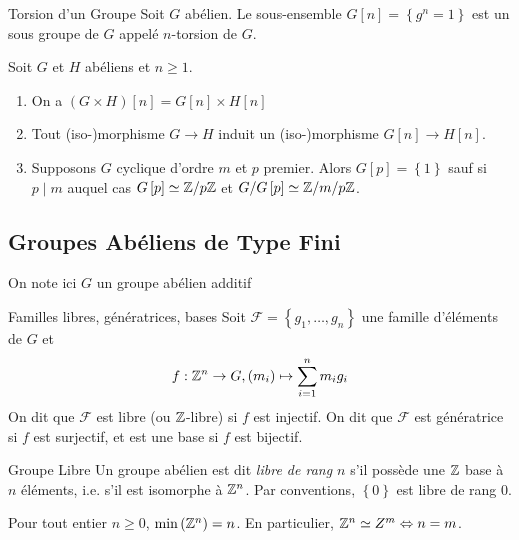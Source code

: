 \documentclass{cours}
\begin{document}
\begin{définition}{Torsion d'un Groupe}{}
    Soit $G$ abélien. Le sous-ensemble $G\left[n\right] = \left\{g^{n} = 1\right\}$ est un sous groupe de $G$ appelé $n$-torsion de $G$.
\end{définition}

\begin{lemma}
    Soit $G$ et $H$ abéliens et $n \geq 1$.
    \begin{enumerate}
        \item On a $\left(G \times H\right)\left[n\right] = G\left[n\right] \times H\left[n\right]$
        \item Tout (iso-)morphisme $G \rightarrow H$ induit un (iso-)morphisme $G\left[n\right] \rightarrow H\left[n\right]$.
        \item Supposons $G$ cyclique d'ordre $m$ et $p$ premier. Alors $G\left[p\right] = \left\{1\right\}$ sauf si $p \mid m$ auquel cas $G\left[p\right] \simeq \mathbb{Z}/p\mathbb{Z}$ et $G/G\left[p\right] \simeq \mathbb{Z}/m/p\mathbb{Z}$.
    \end{enumerate}
\end{lemma}

\subsection{Groupes Abéliens de Type Fini}
On note ici $G$ un groupe abélien additif

\begin{définition}{Familles libres, génératrices, bases}{}
    Soit $\mathcal{F} = \left\{g_{1},\ldots, g_{n}\right\}$ une famille d'éléments de $G$ et
    \[
        f : \mathbb{Z}^{n} \rightarrow G, (m_{i}) \mapsto \sum_{i = 1}^{n}m_{i}g_{i}
    \]
    On dit que $\mathcal{F}$ est libre (ou $\mathbb{Z}$-libre) si $f$ est injectif. On dit que $\mathcal{F}$ est génératrice si $f$ est surjectif, et est une base si $f$ est bijectif.
\end{définition}

\begin{définition}{Groupe Libre}{}
    Un groupe abélien est dit \emph{libre de rang $n$} s'il possède une $\mathbb{Z}$ base à $n$ éléments, i.e. s'il est isomorphe à $\mathbb{Z}^{n}$. Par conventions, $\left\{0\right\}$ est libre de rang $0$.
\end{définition}

\begin{lemma}
    Pour tout entier $n\geq 0$, $\min{\left(\mathbb{Z}^{n}\right)} = n$. En particulier, $\mathbb{Z}^{n} \simeq Z^{m} \Leftrightarrow n = m$.
\end{lemma}
\end{document}
